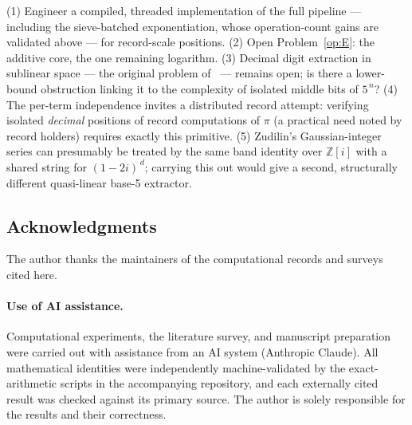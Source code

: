\documentclass[11pt]{article}
\theoremstyle{remark}
\theoremstyle{definition}
\begin{document}
(1) Engineer a compiled, threaded implementation of the full pipeline
--- including the sieve-batched exponentiation, whose operation-count
gains are validated above --- for record-scale positions. (2) Open
Problem~\ref{op:E}: the additive core, the one remaining logarithm. (3) Decimal digit extraction in sublinear
space --- the original problem of~\cite{BBP97} --- remains open; is there
a lower-bound obstruction linking it to the complexity of isolated middle
bits of $5^{\,n}$? (4) The per-term independence invites a distributed
record attempt: verifying isolated \emph{decimal} positions of record
computations of $\pi$ (a practical need noted by record holders) requires
exactly this primitive. (5) Zudilin's Gaussian-integer series can
presumably be treated by the same band identity over $\mathbb{Z}[i]$ with
a shared string for $(1{-}2i)^{\,d}$; carrying this out would give a
second, structurally different quasi-linear base-5 extractor.

\subsection*{Acknowledgments}
The author thanks the maintainers of the computational records and surveys
cited here.

\paragraph{Use of AI assistance.} Computational experiments, the literature
survey, and manuscript preparation were carried out with assistance from an AI
system (Anthropic Claude). All mathematical identities were independently
machine-validated by the exact-arithmetic scripts in the accompanying
repository, and each externally cited result was checked against its primary
source. The author is solely responsible for the results and their correctness.
\end{document}
